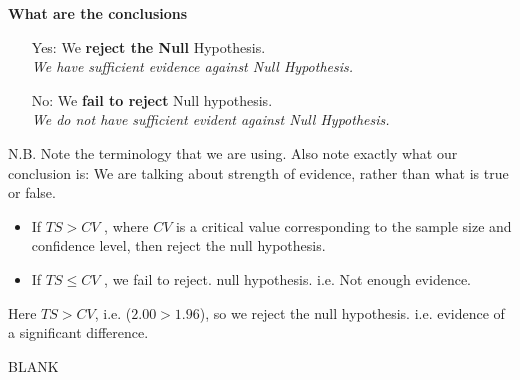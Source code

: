 \documentclass[a4paper,12pt]{article}
\begin{document}
\begin{framed}
\noindent \textbf{What are the conclusions}
	\begin{itemize} 
		
		\item[Yes:] We \textbf{reject the Null} Hypothesis. \\ \textit{We have sufficient evidence against Null Hypothesis.}
		
		\item[No:] We \textbf{fail to reject} Null hypothesis. \\ \textit{We do not have sufficient evident against Null Hypothesis.}
	\end{itemize}	
	{	\normalsize
		N.B. Note the terminology that we are using. Also note exactly what our conclusion is: We are talking about strength of evidence, rather than what is true or false.}
	
\end{framed}
	\smallskip
\begin{framed}
\begin{itemize}
	\item 	If $TS > CV$ , where $CV$ is a critical value corresponding to the sample size and confidence level, then reject the null hypothesis. 
	\item  If $TS \leq CV$ , we fail to reject. null hypothesis. i.e. Not enough evidence. 
	\end{itemize}	
\end{framed}	

\noindent Here $TS > CV$, i.e. ($2.00 > 1.96$), so we reject the null hypothesis. i.e. evidence of a significant difference. 
	
\newpage
BLANK
	
\end{document}
